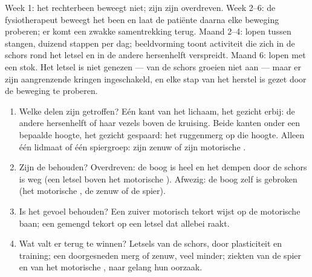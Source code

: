 \begin{example}\label{ex:g12:brain-and-movement:sixmonths}
Week 1: het rechterbeen beweegt niet; zijn  zijn overdreven. Week
2--6: de fysiotherapeut beweegt het been en laat de patiënte daarna elke
beweging proberen; er komt een zwakke samentrekking terug. Maand 2--4:
lopen tussen stangen, duizend stappen per dag; beeldvorming toont
activiteit die zich in de schors rond het letsel en in de andere
hersenhelft verspreidt. Maand 6: lopen met een stok. Het letsel is niet
genezen ---  van de schors groeien niet aan --- maar er zijn
aangrenzende kringen ingeschakeld, en elke stap van het herstel is gezet
door de beweging te proberen.
\end{example}

\begin{method}\label{met:g12:brain-and-movement:locate}
\begin{enumerate}
  \item Welke delen zijn getroffen? Eén kant van het lichaam, het gezicht
        erbij: de andere hersenhelft of haar vezels boven de kruising.
        Beide kanten onder een bepaalde hoogte, het gezicht gespaard: het
        ruggenmerg op die hoogte. Alleen één lidmaat of één spiergroep:
        zijn zenuw of zijn motorische .
  \item Zijn de  behouden? Overdreven: de boog is heel en het
        dempen door de schors is weg (een letsel boven het motorische
        ). Afwezig: de boog zelf is gebroken (het motorische ,
        de zenuw of de spier).
  \item Is het gevoel behouden? Een zuiver motorisch tekort wijst op de
        motorische baan; een gemengd tekort op een letsel dat allebei
        raakt.
  \item Wat valt er terug te winnen? Letsels van de schors, door
        plasticiteit en training; een doorgesneden merg of zenuw, veel
        minder; ziekten van de spier en van het motorische , naar
        gelang hun oorzaak.
\end{enumerate}
\end{method}

